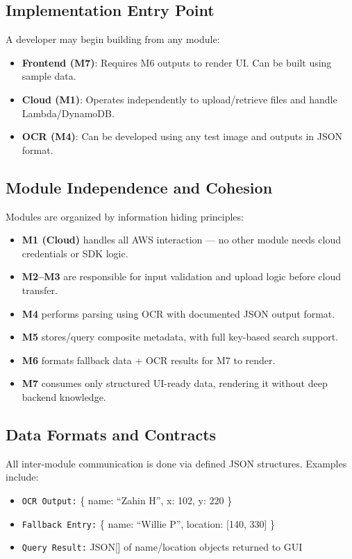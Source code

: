 \documentclass[12pt, titlepage]{article}
\begin{document}
\subsection*{Implementation Entry Point}
A developer may begin building from any module:
\begin{itemize}
  \item \textbf{Frontend (M7)}: Requires M6 outputs to render UI. Can be built using sample data.
  \item \textbf{Cloud (M1)}: Operates independently to upload/retrieve files and handle Lambda/DynamoDB.
  \item \textbf{OCR (M4)}: Can be developed using any test image and outputs in JSON format.
\end{itemize}

\subsection*{Module Independence and Cohesion}
Modules are organized by information hiding principles:
\begin{itemize}
  \item \textbf{M1 (Cloud)} handles all AWS interaction — no other module needs cloud credentials or SDK logic.
  \item \textbf{M2–M3} are responsible for input validation and upload logic before cloud transfer.
  \item \textbf{M4} performs parsing using OCR with documented JSON output format.
  \item \textbf{M5} stores/query composite metadata, with full key-based search support.
  \item \textbf{M6} formats fallback data + OCR results for M7 to render.
  \item \textbf{M7} consumes only structured UI-ready data, rendering it without deep backend knowledge.
\end{itemize}

\subsection*{Data Formats and Contracts}
All inter-module communication is done via defined JSON structures. Examples include:
\begin{itemize}
  \item \texttt{OCR Output:} \{ name: ``Zahin H'', x: 102, y: 220 \}
  \item \texttt{Fallback Entry:} \{ name: ``Willie P'', location: [140, 330] \}
  \item \texttt{Query Result:} JSON[] of name/location objects returned to GUI
\end{itemize}
\end{document}
